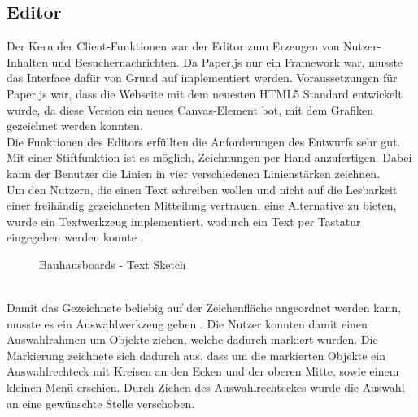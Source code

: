 \subsection{Editor}\label{Editor}
Der Kern der Client-Funktionen war der Editor zum Erzeugen von Nutzer-Inhalten und Besuchernachrichten. Da Paper.js nur ein Framework war, musste das Interface dafür von Grund auf implementiert werden.
Voraussetzungen für Paper.js war, dass die Webseite mit dem neuesten HTML5 Standard entwickelt wurde, da diese Version ein neues Canvas-Element bot, mit dem Grafiken gezeichnet werden konnten.
\\
Die Funktionen des Editors erfüllten die Anforderungen des Entwurfs sehr gut.
Mit einer Stiftfunktion ist es möglich, Zeichnungen per Hand anzufertigen. Dabei kann der Benutzer die Linien in vier verschiedenen Linienstärken zeichnen.
\\
Um den Nutzern, die einen Text schreiben wollen und nicht auf die Lesbarkeit einer freihändig gezeichneten Mitteilung vertrauen, eine Alternative zu bieten, wurde ein Textwerkzeug implementiert, wodurch ein Text per Tastatur eingegeben werden konnte .
\begin{figure}
  \centering
  \caption{Bauhausboards - Text Sketch}
  \label{img:editorTextSketch}
\end{figure}
\\
Damit das Gezeichnete beliebig auf der Zeichenfläche angeordnet werden kann, musste es ein Auswahlwerkzeug geben .
Die Nutzer konnten damit einen Auswahlrahmen um Objekte ziehen, welche dadurch markiert wurden.
Die Markierung zeichnete sich dadurch aus, dass um die markierten Objekte ein Auswahlrechteck mit Kreisen an den Ecken und der oberen Mitte, sowie einem kleinen Menü erschien.
Durch Ziehen des Auswahlrechteckes wurde die Auswahl an eine gewünschte Stelle verschoben.

